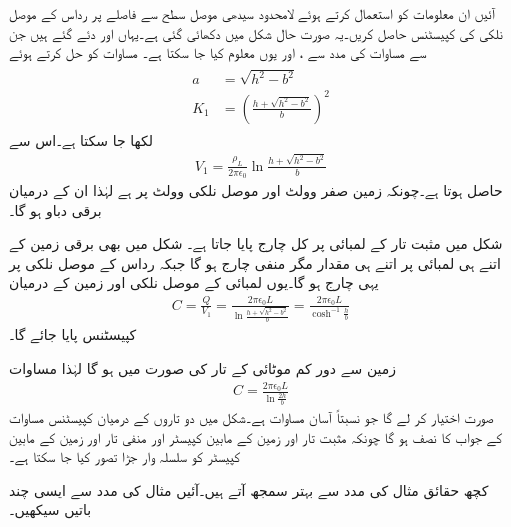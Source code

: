 آئیں ان معلومات کو استعمال کرتے ہوئے لامحدود سیدھی موصل سطح  سے  فاصلے پر  رداس کے موصل نلکی کی کپیسٹنس حاصل کریں۔یہ صورت حال شکل  میں دکھائی گئی ہے۔یہاں  اور  دئے گئے ہیں جن سے مساوات  کی مدد سے ،  اور یوں  معلوم کیا جا سکتا ہے۔ مساوات  کو حل کرتے ہوئے
\begin{gather}
\begin{aligned}\label{مساوات_کپیسٹر_موصل_نلکی_زمین_متغیرات}
a&=\sqrt{h^2-b^2}\\
K_1&=\left(\frac{h+\sqrt{h^2-b^2}}{b}\right)^2
\end{aligned}
\end{gather} 
لکھا جا سکتا ہے۔اس سے
\begin{align*}
V_1=\frac{\rho_L}{2\pi\epsilon_0} \ln \frac{h+\sqrt{h^2-b^2}}{b}
\end{align*}
حاصل ہوتا ہے۔چونکہ زمین صفر وولٹ اور موصل نلکی  وولٹ پر ہے لہٰذا ان کے درمیان  برقی دباو ہو گا۔

شکل  میں مثبت تار کے  لمبائی پر کل چارج  پایا جاتا ہے۔ شکل   میں بھی برقی زمین کے اتنے ہی لمبائی پر اتنے ہی مقدار مگر منفی چارج ہو گا جبکہ  رداس کے موصل نلکی پر یہی  چارج ہو گا۔یوں  لمبائی کے موصل نلکی اور زمین کے درمیان
\begin{align}\label{مساوات_کپیسٹر_نلکی_زمین_کپیسٹنس}
C=\frac{Q}{V_1}=\frac{2\pi\epsilon_0 L}{ \ln \frac{h+\sqrt{h^2-b^2}}{b}}=\frac{2\pi\epsilon_0 L}{\cosh^{-1} \frac{h}{b}}
\end{align}
کپیسٹنس پایا جائے گا۔

زمین سے دور کم موٹائی کے تار کی صورت میں  ہو گا لہٰذا مساوات 
\begin{align}
C=\frac{2\pi\epsilon_0 L}{ \ln \frac{2h}{b}}
\end{align}
صورت اختیار کر لے گا جو نسبتاً آسان مساوات ہے۔شکل  میں دو تاروں کے درمیان کپیسٹنس مساوات  کے جواب کا نصف ہو گا چونکہ مثبت تار اور زمین کے مابین کپیسٹر اور منفی تار اور زمین کے مابین کپیسٹر کو سلسلہ وار جڑا تصور کیا جا سکتا ہے۔   

کچھ حقائق مثال کی مدد سے بہتر سمجھ آتے ہیں۔آئیں مثال  کی مدد سے ایسی چند باتیں سیکھیں۔

